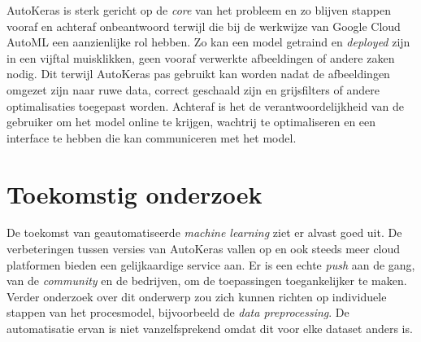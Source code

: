 \documentclass[a0,portrait]{a0poster}
\begin{document}
\begin{multicols}{2}
AutoKeras is sterk gericht op de \textit{core} van het probleem en zo blijven stappen vooraf en achteraf onbeantwoord terwijl die bij de werkwijze van Google Cloud AutoML een aanzienlijke rol hebben. Zo kan een model getraind en \textit{deployed} zijn in een vijftal muisklikken, geen vooraf verwerkte afbeeldingen of andere zaken nodig. Dit terwijl AutoKeras pas gebruikt kan worden nadat de afbeeldingen omgezet zijn naar ruwe data, correct geschaald zijn en grijsfilters of andere optimalisaties toegepast worden. Achteraf is het de verantwoordelijkheid van de gebruiker om het model online te krijgen, wachtrij te optimaliseren en een interface te hebben die kan communiceren met het model.

\color{HoGentAccent1} 
\section*{Toekomstig onderzoek}
\color{black}

De toekomst van geautomatiseerde \textit{machine learning} ziet er alvast goed uit. De verbeteringen tussen versies van AutoKeras vallen op en ook steeds meer cloud platformen bieden een gelijkaardige service aan. Er is een echte \textit{push} aan de gang, van de \textit{community} en de bedrijven, om de toepassingen toegankelijker te maken. Verder onderzoek over dit onderwerp zou zich kunnen richten op individuele stappen van het procesmodel, bijvoorbeeld de \textit{data preprocessing}. De automatisatie ervan is niet vanzelfsprekend omdat dit voor elke dataset anders is.



\end{multicols}
\end{document}
